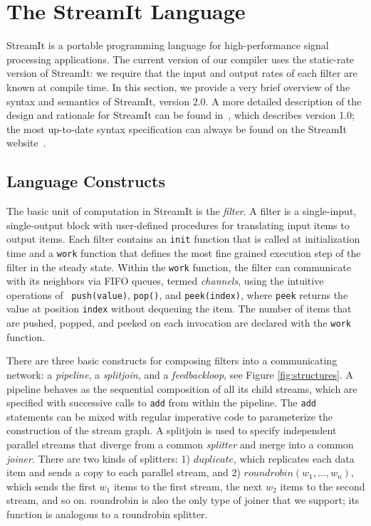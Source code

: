 \section{The StreamIt Language}
\label{sec:streamit}

StreamIt is a portable programming language for high-performance
signal processing applications.  The current version of our compiler
uses the static-rate version of StreamIt: we require that the input and
output rates of each filter are known at compile time.  In this
section, we provide a very brief overview of the syntax and semantics
of StreamIt, version 2.0.  A more detailed description of the design
and rationale for StreamIt can be found in~\cite{streamitcc}, which
describes version 1.0; the most up-to-date syntax specification can
always be found on the StreamIt website~\cite{streamitweb}.

\subsection{Language Constructs}

The basic unit of computation in StreamIt is the {\it filter}.  A
filter is a single-input, single-output block with user-defined
procedures for translating input items to output items.  Each filter
contains an {\tt init} function that is called at initialization time
and a {\tt work} function that defines the most fine grained execution
step of the filter in the steady state.  Within the {\tt work}
function, the filter can communicate with its neighbors via FIFO
queues, termed {\it channels}, using the intuitive operations of {\tt
push(value)}, {\tt pop()}, and {\tt peek(index)}, where {\tt peek}
returns the value at position {\tt index} without dequeuing the item.
The number of items that are pushed, popped, and peeked on each
invocation are declared with the {\tt work} function.

There are three basic constructs for composing filters into a
communicating network: a {\it pipeline}, a {\it splitjoin}, and a {\it
feedbackloop}, see Figure \ref{fig:structures}.  A pipeline behaves as
the sequential composition of all its child streams, which are
specified with successive calls to {\tt add} from within the pipeline.
The {\tt add} statements can be mixed with regular imperative code to
parameterize the construction of the stream graph. A splitjoin is used
to specify independent parallel streams that diverge from a common
{\it splitter} and merge into a common {\it joiner}.  There are two
kinds of splitters: 1) $duplicate$, which replicates each data item
and sends a copy to each parallel stream, and 2) $roundrobin(w_1,
\dots, w_n)$, which sends the first $w_1$ items to the first stream,
the next $w_2$ items to the second stream, and so on. roundrobin is
also the only type of joiner that we support; its function is
analogous to a roundrobin splitter.

